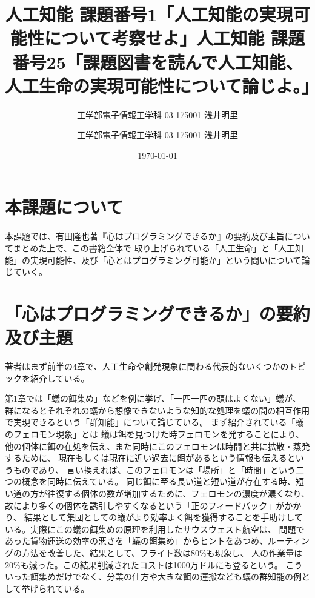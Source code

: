 \documentclass[uplatex]{jsarticle}
\title{人工知能 課題番号1「人工知能の実現可能性について考察せよ」}
\author{工学部電子情報工学科 03-175001 浅井明里}
\title{人工知能 課題番号25「課題図書を読んで人工知能、人工生命の実現可能性について論じよ。」}
\author{工学部電子情報工学科 03-175001 浅井明里}
\date{\today}
\makeatletter
\def\maketitle{%
  \null
  \thispagestyle{empty}%
  \vfill
  \begin{center}\leavevmode
    \normalfont
    {\LARGE \@title\par}%
    \vskip 1cm
    {\Large \@author\par}%
    \vskip 1cm
    {\Large \@date\par}%
  \end{center}%
  \vfill
  \null
  \@thanks%
  \cleardoublepage
  }
\makeatother
\begin{document}
\maketitle


\section{本課題について}
本課題では、有田隆也著『心はプログラミングできるか』の要約及び主旨についてまとめた上で、この書籍全体で
取り上げられている「人工生命」と「人工知能」の実現可能性、及び「心とはプログラミング可能か」という問いについて論じていく。

\section{「心はプログラミングできるか」の要約及び主題}
著者はまず前半の4章で、人工生命や創発現象に関わる代表的ないくつかのトピックを紹介している。

第1章では「蟻の餌集め」などを例に挙げ、「一匹一匹の頭はよくない」蟻が、
群になるとそれぞれの蟻から想像できないような知的な処理を蟻の間の相互作用で実現できるという「群知能」について論じている。
まず紹介されている「蟻のフェロモン現象」とは
蟻は餌を見つけた時フェロモンを発することにより、
他の個体に餌の在処を伝え、また同時にこのフェロモンは時間と共に拡散・蒸発するために、
現在もしくは現在に近い過去に餌があるという情報も伝えるというものであり、
言い換えれば、このフェロモンは「場所」と「時間」という二つの概念を同時に伝えている。
同じ餌に至る長い道と短い道が存在する時、短い道の方が往復する個体の数が増加するために、フェロモンの濃度が濃くなり、
故により多くの個体を誘引しやすくなるという「正のフィードバック」がかかり、
結果として集団としての蟻がより効率よく餌を獲得することを手助けしている。実際にこの蟻の餌集めの原理を利用したサウスウェスト航空は、
問題であった貨物運送の効率の悪さを「蟻の餌集め」からヒントをあつめ、ルーティングの方法を改善した、結果として、フライト数は80\%も現象し、
人の作業量は20\%も減った。この結果削減されたコストは1000万ドルにも登るという。
こういった餌集めだけでなく、分業の仕方や大きな餌の運搬なども蟻の群知能の例として挙げられている。
\end{document}
